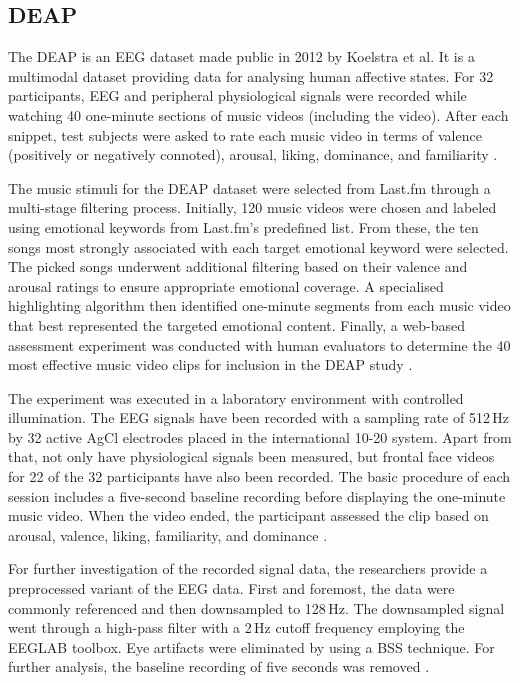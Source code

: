     \subsection{DEAP}\label{sec:deap}
      The \ac{DEAP} is an \ac{EEG} dataset made public in 2012 by Koelstra et al. It is a multimodal dataset providing data for analysing human affective states. For 32 participants, \ac{EEG} and peripheral physiological signals were recorded while watching 40 one-minute sections of music videos (including the video). After each snippet, test subjects were asked to rate each music video in terms of valence (positively or negatively connoted), arousal, liking, dominance, and familiarity \cite{koelstra2012deap}.\par
      The music stimuli for the \ac{DEAP} dataset were selected from Last.fm through a multi-stage filtering process. Initially, 120 music videos were chosen and labeled using emotional keywords from Last.fm's predefined list. From these, the ten songs most strongly associated with each target emotional keyword were selected. The picked songs underwent additional filtering based on their valence and arousal ratings to ensure appropriate emotional coverage. A specialised highlighting algorithm then identified one-minute segments from each music video that best represented the targeted emotional content. Finally, a web-based assessment experiment was conducted with human evaluators to determine the 40 most effective music video clips for inclusion in the \ac{DEAP} study \cite{koelstra2012deap}. \par
      The experiment was executed in a laboratory environment with controlled illumination. The \ac{EEG} signals have been recorded with a sampling rate of 512\,Hz by 32 active AgCl electrodes placed in the international 10-20 system. Apart from that, not only have physiological signals been measured, but frontal face videos for 22 of the 32 participants have also been recorded. The basic procedure of each session includes a five-second baseline recording before displaying the one-minute music video. When the video ended, the participant assessed the clip based on arousal, valence, liking, familiarity, and dominance \cite{koelstra2012deap}. \par
      For further investigation of the recorded signal data, the researchers provide a preprocessed variant of the \ac{EEG} data. First and foremost, the data were commonly referenced and then downsampled to 128\,Hz. The downsampled signal went through a high-pass filter with a 2\,Hz cutoff frequency employing the EEGLAB toolbox. Eye artifacts were eliminated by using a \ac{BSS} technique. For further analysis, the baseline recording of five seconds was removed \cite{koelstra2012deap}.

